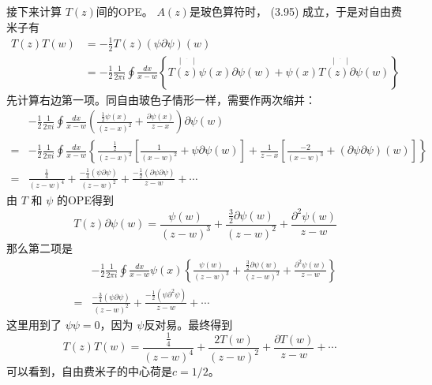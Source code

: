 接下来计算 $T(z) $间的OPE。 $A(z) $是玻色算符时， (3.95) 成立，于是对自由费米子有
\begin{equation}
	\begin{aligned} T(z) T(w) &=-\frac{1}{2} T(z)(\psi \partial \psi)(w) \\ &=-\frac{1}{2} \frac{1}{2 \pi i} \oint \frac{d x}{x-w}\left\{{ \overset{|^{\overline{\quad \quad }}|}{T(z) \psi}(x)} \partial \psi(w)+\psi(x) \overset{|^{\overline{\quad \quad }}|}{T(z) \partial \psi}(w)\right\} \end{aligned}
\end{equation}
先计算右边第一项。同自由玻色子情形一样，需要作两次缩并：
\begin{equation}
	\begin{aligned} &-\frac{1}{2} \frac{1}{2 \pi i} \oint \frac{d x}{x-w}\left(\frac{\frac{1}{2} \psi(x)}{(z-x)^{2}}+\frac{\partial \psi(x)}{z-x}\right) \partial \psi(w) \\ =&-\frac{1}{2} \frac{1}{2 \pi i} \oint \frac{d x}{x-w}\left\{\frac{\frac{1}{2}}{(z-x)^{2}}\left[\frac{1}{(x-w)^{2}}+\psi \partial \psi(w)\right]+\frac{1}{z-x}\left[\frac{-2}{(x-w)^{3}}+(\partial \psi \partial \psi)(w)\right]\right\} \\ =& \frac{\frac{1}{4}}{(z-w)^{4}}+\frac{-\frac{1}{4}(\psi \partial \psi)}{(z-w)^{2}}+\frac{-\frac{1}{2}(\partial \psi \partial \psi)}{z-w}+\cdots \end{aligned}
\end{equation}
由 $T$ 和 $\psi$ 的OPE得到
\begin{equation}
	T(z) \partial \psi(w)=\frac{\psi(w)}{(z-w)^{3}}+\frac{\frac{3}{2} \partial \psi(w)}{(z-w)^{2}}+\frac{\partial^{2} \psi(w)}{z-w}
\end{equation}
那么第二项是
\begin{equation}
	\begin{aligned} &-\frac{1}{2} \frac{1}{2 \pi i} \oint \frac{d x}{x-w} \psi(x)\left\{\frac{\psi(w)}{(z-w)^{3}}+\frac{\frac{3}{2} \partial \psi(w)}{(z-w)^{2}}+\frac{\partial^{2} \psi(w)}{z-w}\right\} \\ =& \frac{-\frac{3}{4}(\psi \partial \psi)}{(z-w)^{2}}+\frac{-\frac{1}{2}\left(\psi \partial^{2} \psi\right)}{z-w}+\cdots \end{aligned}
\end{equation}
这里用到了 $\psi\psi=0 $，因为 $\psi $反对易。最终得到
\begin{equation}
	T(z) T(w)=\frac{\frac{1}{4}}{(z-w)^{4}}+\frac{2 T(w)}{(z-w)^{2}}+\frac{\partial T(w)}{z-w}+\cdots\quad
\end{equation}
可以看到，自由费米子的中心荷是$ c=1/2 $。

